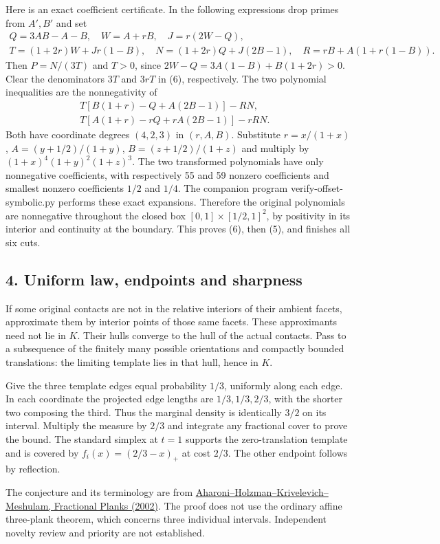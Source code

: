 \documentclass[
  10pt,
]{article}
\begin{document}
Here is an exact coefficient certificate. In the following expressions
drop primes from \(A',B'\) and set \[
\begin{gathered}
 Q=3AB-A-B,\quad W=A+rB,\quad J=r(2W-Q),\\
 T=(1+2r)W+Jr(1-B),\quad N=(1+2r)Q+J(2B-1),\quad
 R=rB+A(1+r(1-B)).
\end{gathered}
\] Then \(P=N/(3T)\) and \(T>0\), since \(2W-Q=3A(1-B)+B(1+2r)>0\).
Clear the denominators \(3T\) and \(3rT\) in (6), respectively. The two
polynomial inequalities are the nonnegativity of \[
\begin{split}
 T[B(1+r)-Q+A(2B-1)]-RN,\qquad\\
 T[A(1+r)-rQ+rA(2B-1)]-rRN .
\end{split}
\] Both have coordinate degrees \((4,2,3)\) in \((r,A,B)\). Substitute
\(r=x/(1+x)\), \(A=(y+1/2)/(1+y)\), \(B=(z+1/2)/(1+z)\) and multiply by
\((1+x)^4(1+y)^2(1+z)^3\). The two transformed polynomials have only
nonnegative coefficients, with respectively 55 and 59 nonzero
coefficients and smallest nonzero coefficients \(1/2\) and \(1/4\). The
companion program verify-offset-symbolic.py performs these exact
expansions. Therefore the original polynomials are nonnegative
throughout the closed box \([0,1]\times[1/2,1]^2\), by positivity in its
interior and continuity at the boundary. This proves (6), then (5), and
finishes all six cuts.

\subsection{4. Uniform law, endpoints and
sharpness}\label{uniform-law-endpoints-and-sharpness}

If some original contacts are not in the relative interiors of their
ambient facets, approximate them by interior points of those same
facets. These approximants need not lie in \(K\). Their hulls converge
to the hull of the actual contacts. Pass to a subsequence of the
finitely many possible orientations and compactly bounded translations:
the limiting template lies in that hull, hence in \(K\).

Give the three template edges equal probability \(1/3\), uniformly along
each edge. In each coordinate the projected edge lengths are
\(1/3,1/3,2/3\), with the shorter two composing the third. Thus the
marginal density is identically \(3/2\) on its interval. Multiply the
measure by \(2/3\) and integrate any fractional cover to prove the
bound. The standard simplex at \(t=1\) supports the zero-translation
template and is covered by \(f_i(x)=(2/3-x)_+\) at cost \(2/3\). The
other endpoint follows by reflection.

The conjecture and its terminology are from
\href{https://doi.org/10.1007/s00454-001-0088-x}{Aharoni--Holzman--Krivelevich--Meshulam,
Fractional Planks (2002)}. The proof does not use the ordinary affine
three-plank theorem, which concerns three individual intervals.
Independent novelty review and priority are not established.
\end{document}
